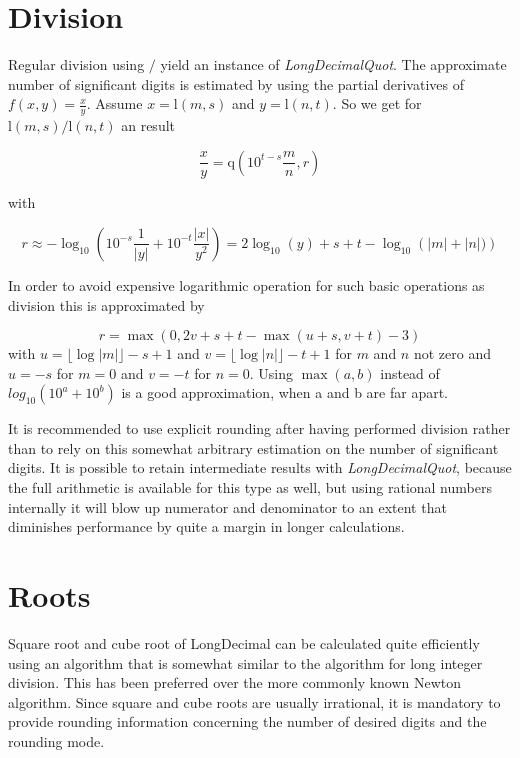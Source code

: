 \documentclass[10pt,a4paper]{article}
\def\ld{\mathrm l}
\def\ldq{\mathrm q}
\begin{document}
\pagebreak

\section{Division}

Regular division using $/$ yield an instance of {\slshape LongDecimalQuot\/}.  The approximate number of significant digits is estimated by using the partial derivatives of $f(x, y) = \frac{x}{y}$.
Assume $x=\ld(m, s)$ and $y=\ld(n, t)$.  So we get for $\ld(m, s) / \ld(n, t)$ an result 

$$\frac{x}{y} = \ldq(10^{t-s}\frac{m}{n}, r)$$

with 

$$r \approx -\log_{10}\left(10^{-s} \frac{1}{|y|} + 10^{-t} \frac{|x|}{y^2}\right) 
    =  2 \log_{10}(y) + s + t -\log_{10}\left(|m| + |n|) \right)$$

In order to avoid expensive logarithmic operation for such basic operations as division this is approximated by

$$r = \max( 0, 2 v + s + t - \max( u + s, v + t) - 3)$$
with $u = \lfloor\log |m| \rfloor - s + 1$ and $v = \lfloor\log |n| \rfloor - t + 1$ for $m$ and $n$ not zero 
and $u=-s$ for $m = 0$ and $v=-t$ for $n=0$.  Using $\max(a, b)$ instead of $log_{10}(10^a + 10^b)$ is a good approximation, when a and b are far apart.

It is recommended to use explicit rounding after having performed
division rather than to rely on this somewhat arbitrary estimation on
the number of significant digits.  It is possible to retain
intermediate results with {\slshape LongDecimalQuot\/}, because the
full arithmetic is available for this type as well, but using rational
numbers internally it will blow up numerator and denominator to an
extent that diminishes performance by quite a margin in longer
calculations.

\pagebreak

\section{Roots}

Square root and cube root of LongDecimal can be calculated quite
efficiently using an algorithm that is somewhat similar to the
algorithm for long integer division.  This has been preferred over the
more commonly known Newton algorithm.  Since square and cube roots are
usually irrational, it is mandatory to provide rounding information
concerning the number of desired digits and the rounding mode.
\end{document}
